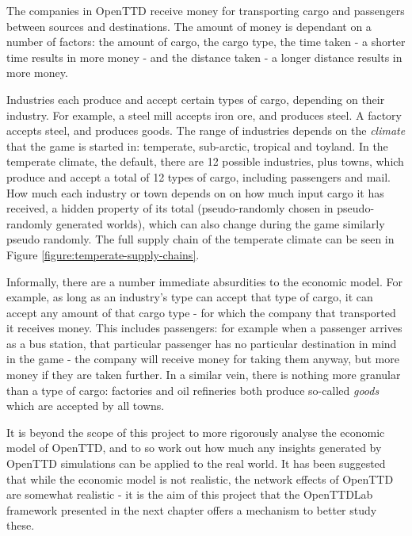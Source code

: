 \documentclass[logo,msc,dsti]{infthesis}    %
\begin{document}
{The companies in OpenTTD receive money for transporting cargo and passengers between sources and destinations. The amount of money is dependant on a number of factors: the amount of cargo, the cargo type, the time taken - a shorter time results in more money - and the distance taken - a longer distance results in more money.

Industries each produce and accept certain types of cargo, depending on their industry. For example, a steel mill accepts iron ore, and produces steel. A factory accepts steel, and produces goods. The range of industries depends on the \emph{climate} that the game is started in: temperate, sub-arctic, tropical and toyland. In the temperate climate, the default, there are 12 possible industries, plus towns, which produce and accept a total of 12 types of cargo, including passengers and mail. How much each industry or town depends on on how much input cargo it has received, a hidden property of its total (pseudo-randomly chosen in pseudo-randomly generated worlds), which can also change during the game similarly pseudo randomly. The full supply chain of the temperate climate can be seen in Figure \ref{figure:temperate-supply-chains}.

Informally, there are a number immediate absurdities to the economic model. For example, as long as an industry's type can accept that type of cargo, it can accept any amount of that cargo type - for which the company that transported it receives money. This includes passengers: for example when a passenger arrives as a bus station, that particular passenger has no particular destination in mind in the game - the company will receive money for taking them anyway, but more money if they are taken further. In a similar vein, there is nothing more granular than a type of cargo: factories and oil refineries both produce so-called \emph{goods} which are accepted by all towns.

It is beyond the scope of this project to more rigorously analyse the economic model of OpenTTD, and to so work out how much any insights generated by OpenTTD simulations can be applied to the real world. It has been suggested that while the economic model is not realistic, the network effects of OpenTTD are somewhat realistic \cite{raghothama2013review} - it is the aim of this project that the OpenTTDLab framework presented in the next chapter offers a mechanism to better study these.

\begin{figure}[h]
\centering
\begin{tikzpicture}[->,>=stealth',shorten >=1pt,auto,node distance=3cm,thick,main node/.style={rectangle,draw}]


\end{tikzpicture}
\end{figure}}
\end{document}
